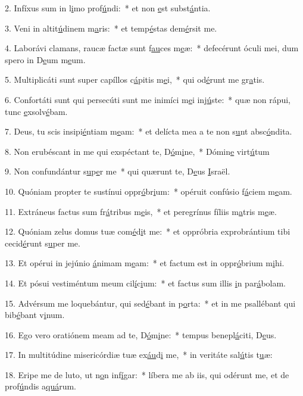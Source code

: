 2. Infíxus sum in l\uline{i}mo prof\uline{ú}ndi:~* et non \uline{e}st subst\uline{á}ntia.\par 
3. Veni in altit\uline{ú}dinem m\uline{a}ris:~* et temp\uline{é}stas dem\uline{é}rsit me.\par 
4. Laborávi clamans, raucæ factæ sunt f\uline{au}ces m\uline{e}æ:~* defecérunt óculi mei, dum spero in D\uline{e}um m\uline{e}um.\par 
5. Multiplicáti sunt super capíllos c\uline{á}pitis m\uline{e}i,~* qui od\uline{é}runt me gr\uline{a}tis.\par 
6. Confortáti sunt qui persecúti sunt me inimíci m\uline{e}i inj\uline{ú}ste:~* quæ non rápui, tunc \uline{e}xsolv\uline{é}bam.\par 
7. Deus, tu scis insipi\uline{é}ntiam m\uline{e}am:~* et delícta mea a te non s\uline{u}nt absc\uline{ó}ndita.\par 
8. Non erubéscant in me qui exspéctant te, D\uline{ó}m\uline{i}ne,~* Dómin\uline{e} virt\uline{ú}tum\par 
9. Non confundántur s\uline{u}p\uline{e}r me~* qui quærunt te, D\uline{e}us \uline{I}sraël.\par 
10. Quóniam propter te sustínui oppr\uline{ó}br\uline{i}um:~* opéruit confúsio f\uline{á}ciem m\uline{e}am.\par 
11. Extráneus factus sum fr\uline{á}tribus m\uline{e}is,~* et peregrínus fíliis m\uline{a}tris m\uline{e}æ.\par 
12. Quóniam zelus domus tuæ com\uline{é}d\uline{i}t me:~* et oppróbria exprobrántium tibi cecid\uline{é}runt s\uline{u}per me.\par 
13. Et opérui in jejúnio \uline{á}nimam m\uline{e}am:~* et factum est in oppr\uline{ó}brium m\uline{i}hi.\par 
14. Et pósui vestiméntum meum cil\uline{í}c\uline{i}um:~* et factus sum illis \uline{i}n par\uline{á}bolam.\par 
15. Advérsum me loquebántur, qui sed\uline{é}bant in p\uline{o}rta:~* et in me psallébant qui bib\uline{é}bant v\uline{i}num.\par 
16. Ego vero oratiónem meam ad te, D\uline{ó}m\uline{i}ne:~* tempus benepl\uline{á}citi, D\uline{e}us.\par 
17. In multitúdine misericórdiæ tuæ ex\uline{áu}d\uline{i} me,~* in veritáte sal\uline{ú}tis t\uline{u}æ:\par 
18. Eripe me de luto, ut n\uline{o}n inf\uline{í}gar:~* líbera me ab iis, qui odérunt me, et de prof\uline{ú}ndis a\uline{quá}rum.\par 
